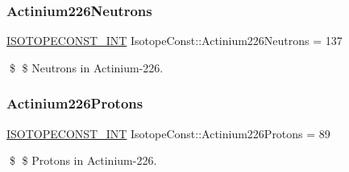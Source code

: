 \subsubsection{\texorpdfstring{Actinium226\+Neutrons}{Actinium226Neutrons}}
{\footnotesize\ttfamily \mbox{\hyperlink{group___isotope_const-_macros_ga5f18360b3e99483a35c32d789e62621c}{I\+S\+O\+T\+O\+P\+E\+C\+O\+N\+S\+T\+\_\+\+I\+NT}} Isotope\+Const\+::\+Actinium226\+Neutrons = 137}

\$ \$ Neutrons in Actinium-\/226. \mbox{\label{group___isotope_const-_actinium-_ac226_ga1c7bfb4eb7851352d74e8e969cbfd926}} 
\subsubsection{\texorpdfstring{Actinium226\+Protons}{Actinium226Protons}}
{\footnotesize\ttfamily \mbox{\hyperlink{group___isotope_const-_macros_ga5f18360b3e99483a35c32d789e62621c}{I\+S\+O\+T\+O\+P\+E\+C\+O\+N\+S\+T\+\_\+\+I\+NT}} Isotope\+Const\+::\+Actinium226\+Protons = 89}

\$ \$ Protons in Actinium-\/226. 